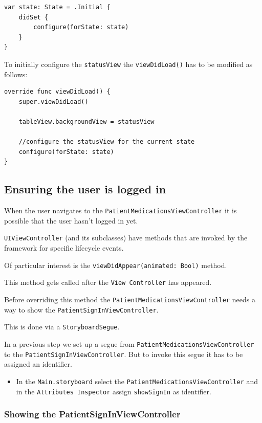 \documentclass{article}
\begin{document}
\begin{verbatim}
var state: State = .Initial {
    didSet {
        configure(forState: state)
    }
}
\end{verbatim}
To initially configure the \texttt{statusView} the
\texttt{viewDidLoad()} has to be modified as follows:

\begin{verbatim}
override func viewDidLoad() {
    super.viewDidLoad()

    tableView.backgroundView = statusView

    //configure the statusView for the current state
    configure(forState: state)
}
\end{verbatim}
\subsection{Ensuring the user is logged in}\label{step-6.2---implementing-patientmedicationsviewcontroller---ensuring-the-user-is-logged-in}

When the user navigates to the \texttt{PatientMedicationsViewController}
it is possible that the user hasn't logged in yet.

\texttt{UIViewController} (and its subclasses) have methods that are
invoked by the framework for specific lifecycle events.

Of particular interest is the \texttt{viewDidAppear(animated:\ Bool)}
method.

This method gets called after the \texttt{View\ Controller} has
appeared.

Before overriding this method the
\texttt{PatientMedicationsViewController} needs a way to show the
\texttt{PatientSignInViewController}.

This is done via a \texttt{StoryboardSegue}.

In a previous step we set up a segue from
\texttt{PatientMedicationsViewController} to the
\texttt{PatientSignInViewController}. But to invoke this segue it has to
be assigned an identifier.

\begin{itemize}

\item
  In the \texttt{Main.storyboard} select the
  \texttt{PatientMedicationsViewController} and in the
  \texttt{Attributes\ Inspector} assign \texttt{showSignIn} as
  identifier.
\end{itemize}

\subsubsection{Showing the PatientSignInViewController}\label{overriding-viewdidappear}
\end{document}
